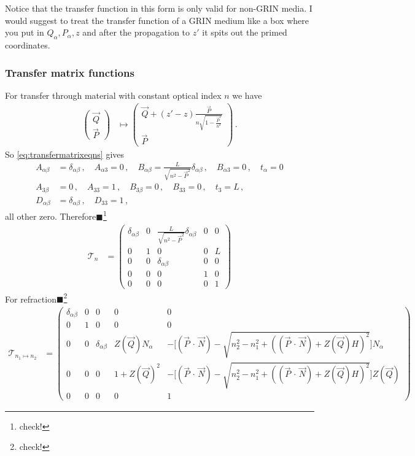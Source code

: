 \documentclass[12pt,a4paper,twoside,openright,BCOR10mm,headsepline,titlepage,abstracton,chapterprefix,final]{scrreprt}
\newcommand{\scpm}[2]{(#1\,\cdot\,#2)}
\newcommand{\remark}[1]{{\color{red}$\blacksquare$}\footnote{{\color{red}#1}}}
\begin{document}
Notice that the transfer function in this form is only valid for non-GRIN media. I would suggest to treat the transfer function of a GRIN medium
like a box where you put in $Q_\alpha, P_\alpha, z$ and after the propagation to $z'$ it spits out the primed coordinates.
\subsubsection{Transfer matrix functions}
For transfer through material with constant optical index $n$ we have
\begin{align}
 \begin{pmatrix}
  \vec{Q} \\
  \vec{P}
 \end{pmatrix} &\mapsto
 \begin{pmatrix}
  \vec{Q} + (z' -z) \frac{\vec{P}}{n \sqrt{1 - \frac{\vec{P}^2}{n^2}}} \\
  \vec{P}
 \end{pmatrix}\,.
\end{align}
So \eqref{eq:transfermatrixeqns} gives
\begin{align}
 A_{\alpha\beta} &= \delta_{\alpha\beta}\,,\quad A_{\alpha 3} = 0\,,\quad B_{\alpha\beta} = \frac{L}{\sqrt{n^2 - \vec{P}^2}} \delta_{\alpha\beta}\,,\quad B_{\alpha3} = 0\,,\quad t_\alpha = 0 \\
 A_{3\beta} &= 0\,,\quad A_{33} = 1\,,\quad B_{3\beta} = 0\,,\quad B_{33} = 0\,,\quad t_3 = L\,,\\
 D_{\alpha\beta} &= \delta_{\alpha\beta}\,,\quad D_{33} = 1\,,
\end{align}
all other zero. Therefore\remark{check!}
\begin{align}
 \mathcal{T}_n &=
 \begin{pmatrix}
  \delta_{\alpha\beta} & 0 &  \frac{L}{\sqrt{n^2 - \vec{P}^2}} \delta_{\alpha\beta} & 0 & 0\\
   0                   & 1 & 0 & 0 & L\\
   0                   & 0 & \delta_{\alpha\beta} & 0 & 0\\
   0                   & 0 & 0 & 1 & 0 \\
   0 & 0 & 0 & 0 & 1
 \end{pmatrix}
\end{align}
For refraction\remark{check!}
\begin{align}
 \mathcal{T}_{n_1\mapsto n_2} &=
 \begin{pmatrix}
  \delta_{\alpha\beta} & 0 &  0 & 0 & 0\\
   0                   & 1 & 0 & 0 & 0\\
   0                   & 0 & \delta_{\alpha\beta} & Z(\vec{Q}) N_\alpha & -\biggl[\scpm{\vec{P}}{\vec{N}} - \sqrt{n_2^2 - n_1^2 + (\scpm{\vec{P}}{\vec{N}} + Z(\vec{Q}) H)^2}\biggr] N_\alpha \\
   0                   & 0 & 0 & 1 + Z(\vec{Q})^2 & -\biggl[\scpm{\vec{P}}{\vec{N}} - \sqrt{n_2^2 - n_1^2 + (\scpm{\vec{P}}{\vec{N}} + Z(\vec{Q}) H)^2}\biggr] Z(\vec{Q}) \\
   0 & 0 & 0 & 0 & 1
 \end{pmatrix}
\end{align}
\end{document}
